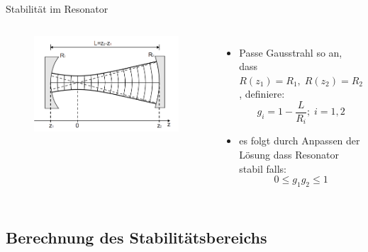 \documentclass[10pt, aspectratio=169]{beamer}
\begin{document}
\begin{frame}{Stabilit\"at im Resonator}
  \begin{columns}
    \begin{figure}
      \includegraphics[width=1\columnwidth]{gauss-res.png}
    \end{figure}
    \begin{itemize}
    \item<1-> Passe Gausstrahl so an, dass
      \(R(z_1)=R_1,\; R(z_2)=R_2\), definiere:
      \begin{equation}
        \label{eq:gparams}
        g_i=1-\frac{L}{R_i};\; i=1,2
      \end{equation}
    \item<2-> es folgt durch Anpassen der L\"osung dass Resonator
      stabil falls:
      \begin{equation}
        \label{eq:stabbed}
        0\leq g_1g_2\leq 1
      \end{equation}
    \end{itemize}
  \end{columns}
\end{frame}


\subsection{Berechnung des Stabilit\"atsbereichs}
\label{sec:stab}
\end{document}
